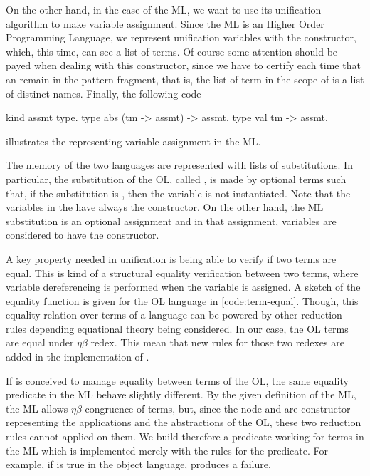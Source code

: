 \documentclass[sigconf,natbib=false]{acmart}
\begin{document}
On the other hand, in the case of the ML, we want to use its unification
algorithm to make variable assignment. Since the ML is an Higher Order
Programming Language, we represent unification variables with the 
constructor, which, this time, can see a list of terms. Of course some attention
should be payed when dealing with this constructor, since we have to certify
each time that an  remain in the pattern fragment, that is, the
list of term in the scope of  is a list of distinct names. Finally,
the following code

\begin{elpicode}
  kind assmt type.
  type abs (tm -> assmt) -> assmt.
  type val tm -> assmt.
\end{elpicode}

\noindent
illustrates the  representing variable assignment in the ML. 

The memory of the two languages are represented with lists of substitutions. In
particular, the substitution of the OL, called , is made by
optional terms such that, if the substitution is , then the
variable is not instantiated. Note that the variables in the 
have always the  constructor. On the other hand, the ML
substitution is an optional assignment and in that assignment, variables are
considered to have the  constructor.

A key property needed in unification is being able to verify if two terms are
equal. This is kind of a structural equality verification between two terms,
where variable dereferencing is performed when the variable is assigned. A
sketch of the equality function is given for the OL language in
\cref{code:term-equal}. Though, this equality relation over terms of a language
can be powered by other reduction rules depending equational theory being
considered. In our case, the OL terms are equal under $\eta\beta$ redex. This mean
that new rules for those two redexes are added in the implementation of
.

If  is conceived to manage equality between terms of the OL,
the same equality predicate in the ML behave slightly different. By the given
definition of the ML, the ML allows $\eta\beta$ congruence of terms, but, since
the node  and  are constructor representing the
applications and the abstractions of the OL, these two reduction rules cannot
applied on them. We build therefore a predicate  working for terms
in the ML which is implemented merely with the rules for the 
predicate. For example, if  is true in the object language,  produces a failure.
\end{document}
